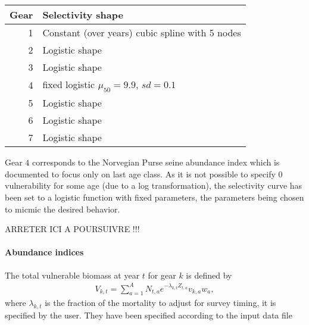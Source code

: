\begin{table}[ht]
\centering
\begin{tabular}{rp{8cm}}
  \hline
  Gear & Selectivity shape \\ 
  \hline
1 & Constant (over years) cubic spline with 5 nodes \\
2 & Logistic shape \\ 
3 & Logistic shape \\
4 & fixed logistic $\mu_{50}=9.9$, $sd=0.1$\\
5 & Logistic shape \\
6 & Logistic shape \\
7 & Logistic shape \\
\hline
\end{tabular}
\end{table}


Gear  $4$ corresponds  to the  Norvegian Purse  seine abundance  index
which is documented  to focus  only on  last age  class. As  it is  not possible  to
specify $0$ vulnerability for some  age (due to a log transformation),
the selectivity curve  has been set to a logistic  function with fixed
parameters, the parameters being chosen to micmic the desired behavior.




ARRETER ICI A POURSUIVRE !!!
\paragraph{Abundance indices}



The total vulnerable biomass at year $t$ for gear $k$ is defined by
\begin{gather}
V_{k,t}=\sum_{a=1}^A N_{t,a} e^{-\lambda_{k,t} Z_{t,a}} v_{k,a} w_a,
\end{gather}
 where $\lambda_{k,t}$ is the fraction  of the mortality to adjust for
 survey timing, it is specified by the user. They have been
 specified according to the input data file 


